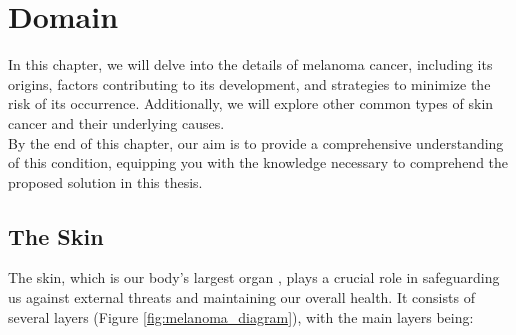 \chapter{Domain} \label{cap:problem_domain}

In this chapter, we will delve into the details of melanoma cancer, including
its origins, factors contributing to its development, and strategies to
minimize the risk of its occurrence. Additionally, we will explore other common
types of skin cancer and their underlying causes. \\

By the end of this chapter, our aim is to provide a comprehensive understanding
of this condition, equipping you with the knowledge necessary to comprehend the
proposed solution in this thesis.

\section{The Skin}

The skin, which is our body's largest organ \cite{BaseCancerKnowledge}, plays a
crucial role in safeguarding us against external threats and maintaining our
overall health. It consists of several layers (Figure
\ref{fig:melanoma_diagram}), with the main layers being:

